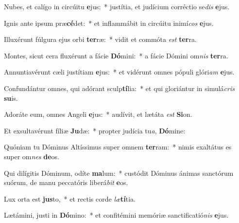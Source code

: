 \item Nubes, et calígo in circúitu \textbf{e}jus:~* justítia, et judícium corréctio se\textit{dis} \textbf{e}jus.
\item Ignis ante ipsum præ\textbf{cé}det:~* et inflammábit in circúitu inimí\textit{cos} \textbf{e}jus.
\item Illuxérunt fúlgura ejus orbi \textbf{ter}ræ:~* vidit et commóta \textit{est} \textbf{ter}ra.
\item Montes, sicut cera fluxérunt a fácie \textbf{Dó}mini:~* a fácie Dómini om\textit{nis} \textbf{ter}ra.
\item Annuntiavérunt cæli justítiam \textbf{e}jus:~* et vidérunt omnes pópuli glóri\textit{am} \textbf{e}jus.
\item Confundántur omnes, qui adórant sculp\textbf{tí}lia:~* et qui gloriántur in simulá\textit{cris} \textbf{su}is.
\item Adoráte eum, omnes Angeli \textbf{e}jus:~* audívit, et lætáta \textit{est} \textbf{Si}on.
\item Et exsultavérunt fíliæ \textbf{Ju}dæ:~* propter judícia tu\textit{a}, \textbf{Dó}mine:
\item Quóniam tu Dóminus Altíssimus super omnem \textbf{ter}ram:~* nimis exaltátus es super om\textit{nes} \textbf{de}os.
\item Qui dilígitis Dóminum, odíte \textbf{ma}lum:~* custódit Dóminus ánimas sanctórum suórum, de manu peccatóris liberá\textit{bit} \textbf{e}os.
\item Lux orta est \textbf{jus}to,~* et rectis corde \textit{læ}\textbf{tí}tia.
\item Lætámini, justi in \textbf{Dó}mino:~* et confitémini memóriæ sanctificatió\textit{nis} \textbf{e}jus.
